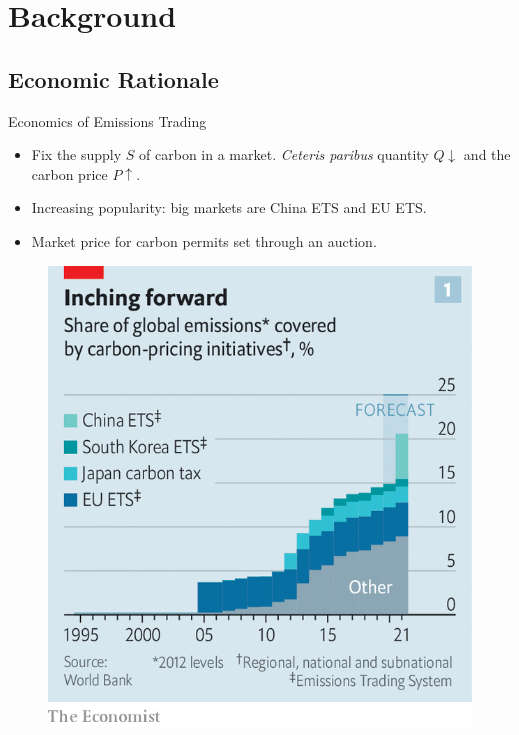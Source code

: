 \section{Background}
\subsection{Economic Rationale}
\begin{frame}{Economics of Emissions Trading}
    \begin{itemize}
        \item Fix the supply $S$ of carbon in a market. \textit{Ceteris paribus}
              quantity $Q \downarrow$ and the carbon price $P \uparrow$.
        \item Increasing popularity: big markets are China ETS and EU ETS.
        \item Market price for carbon permits set through an auction.
    \end{itemize}
    \begin{figure}
        \includegraphics[height=0.5\textheight, width=\linewidth,
            keepaspectratio]{photos/ets.png}
        \centering
    \end{figure}
\end{frame}
